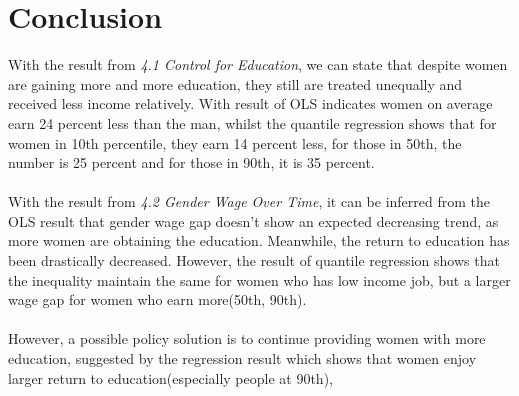 \documentclass{article}
\begin{document}
\section{Conclusion}
With the result from \textit{4.1 Control for Education}, we can state that despite women are gaining more and more education, they still are treated unequally and received less income relatively. With result of OLS indicates women on average earn 24 percent less than the man, whilst the quantile regression shows that for women in 10th percentile, they earn 14 percent less, for those in 50th, the number is 25 percent and for those in 90th, it is 35 percent.\\~\\
With the result from \textit{4.2 Gender Wage Over Time}, it can be inferred from the OLS result that gender wage gap doesn't show an expected decreasing trend, as more women are obtaining the education. Meanwhile, the return to education has been drastically decreased. However, the result of quantile regression shows that the inequality maintain the same for women who has low income job, but a larger wage gap for women who earn more(50th, 90th).\\~\\
However, a possible policy solution is to continue providing women with more education, suggested by the regression result which shows that women enjoy larger return to education(especially people at 90th), 
\end{document}
